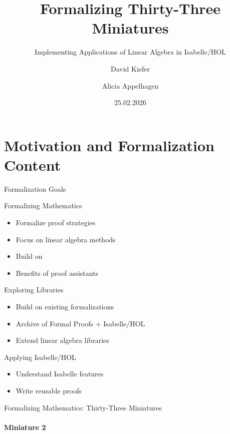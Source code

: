\documentclass[en,navbaroff]{afvbeamer}
\title[Formalizing Thirty-Three Miniatures]{Formalizing Thirty-Three Miniatures}
\subtitle{Implementing Applications of Linear Algebra in Isabelle/HOL}
\author[David, Alicia]{David Kiefer \and Alicia Appelhagen}
\date[25.02.2026]{25.02.2026}
\begin{document}
	
	\begin{frame}%
		\titlepage
	\end{frame}
	
	\section{Motivation and Formalization Content}
	\begin{frame}{Formalization Goals}
		\begin{minipage}[h]{0.33\textwidth}
			\begin{orangeblock}{Formalizing Mathematics}
				\begin{itemize}
					\item Formalize proof strategies
					\item Focus on linear algebra methods
					\item Build on \cite{TODO book}
					\item Benefits of proof assistants
				\end{itemize}
			\end{orangeblock}
		\end{minipage}
		\begin{minipage}[h]{0.33\textwidth}
			\begin{blueblock}{Exploring Libraries}
				\begin{itemize}
					\item Build on existing formalizations
					\item Archive of Formal Proofs + Isabelle/HOL
					\item Extend linear algebra libraries
				\end{itemize}
			\end{blueblock}
		\end{minipage}
		\begin{minipage}[h]{0.33\textwidth}
			\begin{yellowblock}{Applying Isabelle/HOL}
				\begin{itemize}
					\item Understand Isabelle features
					\item Write reusable proofs
				\end{itemize}
			\end{yellowblock}
		\end{minipage}
	\end{frame}
	
	\begin{frame}{Formalizing Mathematics: Thirty-Three Miniatures}
		\framesubtitle{Miniature 2}
	\end{frame}
	
\end{document}
